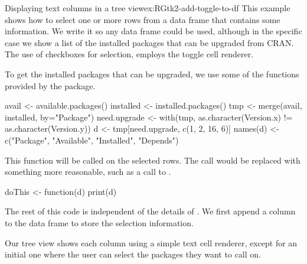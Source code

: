 \begin{example}{Displaying text columns in a tree view}{ex:RGtk2-add-toggle-to-df}
This example shows how to select one or more rows from a data frame
that contains some information. We write it so any data frame could be
used, although in the specific case we show a list of the installed
packages that can be upgraded from CRAN. The use of checkboxes for
selection, employs the toggle cell renderer.


To get the installed packages that can be upgraded, we use some of the
functions provided by the   package.
\begin{Schunk}
\begin{Sinput}
 avail <- available.packages()
 installed <- installed.packages()
 tmp <- merge(avail, installed, by="Package")
 need.upgrade <- with(tmp, as.character(Version.x) 
                      != as.character(Version.y))
 d <- tmp[need.upgrade, c(1, 2, 16, 6)]
 names(d) <- c("Package", "Available", "Installed", "Depends")
\end{Sinput}
\end{Schunk}


This function will be called on the selected rows. The 
call would be replaced with something more reasonable, such as a call
to .
\begin{Schunk}
\begin{Sinput}
 doThis <- function(d) print(d)
\end{Sinput}
\end{Schunk}

The rest of this code is independent of the details of . We first
append a column to the data frame to store the selection information.
\begin{Schunk}
\end{Schunk}

Our tree view shows each column using a simple text cell renderer,
except for an initial one where the user can select the packages they
want to call  on.
\begin{Schunk}
\end{Schunk}


\end{example}
